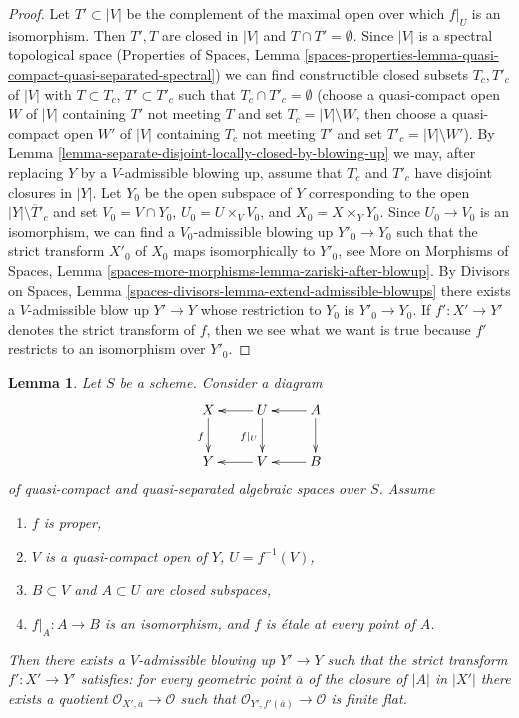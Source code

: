 \documentclass{stacks-project}
\theoremstyle{plain}
\newtheorem{lemma}[subsection]{Lemma}
\theoremstyle{definition}
\theoremstyle{remark}
\numberwithin{equation}{subsection}
\begin{document}
\begin{proof}
Let $T' \subset |V|$ be the complement of the maximal open over which
$f|_U$ is an isomorphism. Then $T', T$ are closed in $|V|$ and
$T \cap T' = \emptyset$. Since $|V|$ is a spectral topological space
(Properties of Spaces, Lemma
\ref{spaces-properties-lemma-quasi-compact-quasi-separated-spectral})
we can find constructible closed subsets $T_c, T'_c$ of $|V|$
with $T \subset T_c$, $T' \subset T'_c$ such that
$T_c \cap T'_c = \emptyset$ (choose a quasi-compact
open $W$ of $|V|$ containing $T'$ not meeting $T$
and set $T_c = |V| \setminus W$, then choose a quasi-compact
open $W'$ of $|V|$ containing $T_c$ not meeting $T'$
and set $T'_c = |V| \setminus W'$).
By Lemma \ref{lemma-separate-disjoint-locally-closed-by-blowing-up}
we may, after replacing $Y$ by a $V$-admissible blowing up,
assume that $T_c$ and $T'_c$ have disjoint closures in $|Y|$.
Let $Y_0$ be the open subspace of $Y$ corresponding to the open
$|Y| \setminus \overline{T}'_c$ and set $V_0 = V \cap Y_0$,
$U_0 = U \times_V V_0$, and $X_0 = X \times_Y Y_0$.
Since $U_0 \to V_0$ is an isomorphism, we can find a
$V_0$-admissible blowing up $Y'_0 \to Y_0$ such that the
strict transform $X'_0$ of $X_0$ maps isomorphically to $Y'_0$, see
More on Morphisms of Spaces, Lemma
\ref{spaces-more-morphisms-lemma-zariski-after-blowup}.
By Divisors on Spaces, Lemma
\ref{spaces-divisors-lemma-extend-admissible-blowups}
there exists a $V$-admissible blow up $Y' \to Y$ whose restriction
to $Y_0$ is $Y'_0 \to Y_0$. If $f' : X' \to Y'$ denotes the
strict transform of $f$, then we see what we want is true because
$f'$ restricts to an isomorphism over $Y'_0$.
\end{proof}

\begin{lemma}
\label{lemma-blowup-etale-along}
Let $S$ be a scheme. Consider a diagram
$$
\xymatrix{
X \ar[d]_f & U \ar[l] \ar[d]_{f|_U} & A \ar[d] \ar[l] \\
Y & V \ar[l] & B \ar[l]
}
$$
of quasi-compact and quasi-separated algebraic spaces over $S$.
Assume
\begin{enumerate}
\item $f$ is proper,
\item $V$ is a quasi-compact open of $Y$, $U = f^{-1}(V)$,
\item $B \subset V$ and $A \subset U$ are closed subspaces,
\item $f|_A : A \to B$ is an isomorphism, and
$f$ is \'etale at every point of $A$.
\end{enumerate}
Then there exists a $V$-admissible blowing up $Y' \to Y$ such that the strict
transform $f' : X' \to Y'$ satisfies: for every geometric point
$\overline{a}$ of the closure of $|A|$ in $|X'|$
there exists a quotient $\mathcal{O}_{X', \overline{a}} \to \mathcal{O}$
such that $\mathcal{O}_{Y', f'(\overline{a})} \to \mathcal{O}$
is finite flat.
\end{lemma}
\end{document}

